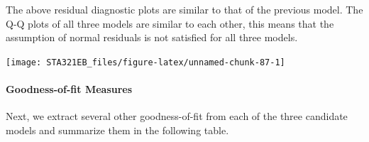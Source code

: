 \documentclass[
]{book}
\newenvironment{Shaded}{\begin{snugshade}}{\end{snugshade}}
\newcommand{\AttributeTok}[1]{\textcolor[rgb]{0.13,0.29,0.53}{#1}}
\newcommand{\CommentTok}[1]{\textcolor[rgb]{0.56,0.35,0.01}{\textit{#1}}}
\newcommand{\DecValTok}[1]{\textcolor[rgb]{0.00,0.00,0.81}{#1}}
\newcommand{\FunctionTok}[1]{\textcolor[rgb]{0.13,0.29,0.53}{\textbf{#1}}}
\newcommand{\NormalTok}[1]{#1}
\newcommand{\SpecialCharTok}[1]{\textcolor[rgb]{0.81,0.36,0.00}{\textbf{#1}}}
\newcommand{\StringTok}[1]{\textcolor[rgb]{0.31,0.60,0.02}{#1}}
\begin{document}
The above residual diagnostic plots are similar to that of the previous model. The Q-Q plots of all three models are similar to each other, this means that the assumption of normal residuals is not satisfied for all three models.

\begin{Shaded}
\end{Shaded}

\begin{center}\texttt{[image: STA321EB\_files/figure-latex/unnamed-chunk-87-1]} \end{center}

\hypertarget{goodness-of-fit-measures}{%
\paragraph{Goodness-of-fit Measures}\label{goodness-of-fit-measures}}

Next, we extract several other goodness-of-fit from each of the three candidate models and summarize them in the following table.
\end{document}
